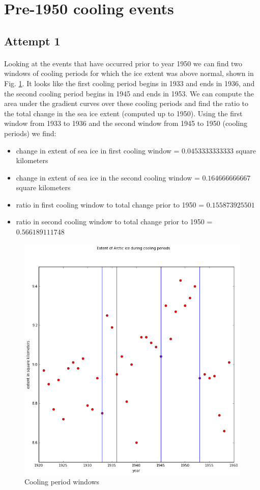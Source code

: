 \documentclass[12pt,a4paper]{article} %
\begin{document}
\section{Pre-1950 cooling events}
\subsection{Attempt 1}
\paragraph{}
Looking at the events that have occurred prior to year 1950 we can find two windows of cooling periods for which the ice extent was above normal, shown in Fig. \ref{windows}. It looks like the first cooling period begins in 1933 and ends in 1936, and the second cooling period begins in 1945 and ends in 1953. We can compute the area under the gradient curves over these cooling periods and find the ratio to the total change in the sea ice extent (computed up to 1950). Using the first window from 1933 to 1936 and the second window from 1945 to 1950 (cooling periods) we find:
\begin{itemize}
\item change in extent of sea ice in first cooling window = $0.0453333333333$ square kilometers
\item change in extent of sea ice in the second cooling window = $0.164666666667$ square kilometers
\item ratio in first cooling window to total change prior to 1950 = $0.155873925501$
\item ratio in second cooling window to total change prior to 1950 = $0.566189111748$
\end{itemize}

\begin{figure}[hp]
\centering
 \includegraphics[width=0.75\linewidth]{../img/windowCooling.png}
\caption{Cooling period windows}
\label{windows}
\end{figure}
\end{document}

